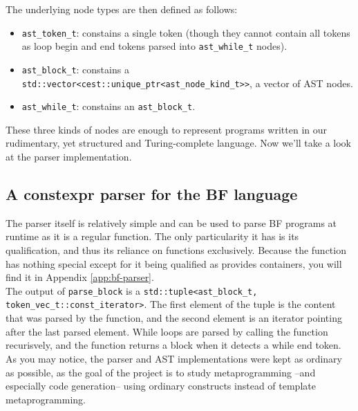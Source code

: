 \documentclass[../../main.tex]{subfiles}
\begin{document}
% 

The underlying node types are then defined as follows:

\begin{itemize}
\item \lstinline|ast_token_t|: constains a single token (though they cannot
      contain all tokens as loop begin and end tokens parsed into
      \lstinline|ast_while_t| nodes).
\item \lstinline|ast_block_t|: constains a
      \lstinline|std::vector<cest::unique_ptr<ast_node_kind_t>>|, \ie a vector
      of AST nodes.
\item \lstinline|ast_while_t|: constains an \lstinline|ast_block_t|.
\end{itemize}

These three kinds of nodes are enough to represent programs written in our
rudimentary, yet structured and Turing-complete language. Now we'll take a look
at the \constexpr parser implementation.

\subsection{A constexpr parser for the BF language}

The parser itself is relatively simple and can be used to parse BF programs at
runtime as it is a regular \cpp function. The only particularity it has is its
\constexpr qualification, and thus its reliance on \constexpr functions
exclusively. Because the function has nothing special except for it being
\constexpr qualified as  provides
\constexpr containers\cite{more-constexpr-containers}, you will find it in
Appendix \ref{app:bf-parser}.\\

The output of \lstinline|parse_block| is a
\lstinline|std::tuple<ast_block_t, token_vec_t::const_iterator>|. The first
element of the tuple is the content that was parsed by the function, and the
second element is an iterator pointing after the last parsed element. While
loops are parsed by calling the function recurisvely, and the function returns a
block when it detects a while end token. As you may notice, the parser and AST
implementations were kept as ordinary as possible, as the goal of the
project is to study metaprogramming --and especially code generation-- using
ordinary \cpp constructs instead of template metaprogramming.\\
\end{document}
